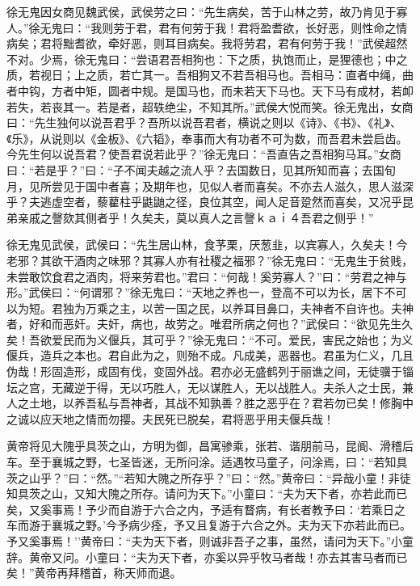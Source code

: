 \documentclass[]{article}
\begin{document}
徐无鬼因女商见魏武侯，武侯劳之曰：``先生病矣，苦于山林之劳，故乃肯见于寡人。''徐无鬼曰：``我则劳于君，君有何劳于我！君将盈耆欲，长好恶，则性命之情病矣；君将黜耆欲，牵好恶，则耳目病矣。我将劳君，君有何劳于我！''武侯超然不对。少焉，徐无鬼曰：``尝语君吾相狗也：下之质，执饱而止，是狸德也；中之质，若视日；上之质，若亡其一。吾相狗又不若吾相马也。吾相马：直者中绳，曲者中钩，方者中矩，圆者中规。是国马也，而未若天下马也。天下马有成材，若卹若失，若丧其一。若是者，超轶绝尘，不知其所。''武侯大悦而笑。徐无鬼出，女商曰：``先生独何以说吾君乎？吾所以说吾君者，横说之则以《诗》、《书》、《礼》、《乐》，从说则以《金板》、《六韬》，奉事而大有功者不可为数，而吾君未尝启齿。今先生何以说吾君？使吾君说若此乎？''徐无鬼曰：``吾直告之吾相狗马耳。''女商曰：``若是乎？''曰：``子不闻夫越之流人乎？去国数日，见其所知而喜；去国旬月，见所尝见于国中者喜；及期年也，见似人者而喜矣。不亦去人滋久，思人滋深乎？夫逃虚空者，藜藋柱乎鼪鼬之径，良位其空，闻人足音跫然而喜矣，又况乎昆弟亲戚之謦欬其侧者乎！久矣夫，莫以真人之言謦ｋａｉ４吾君之侧乎！''

徐无鬼见武侯，武侯曰：``先生居山林，食芧栗，厌葱韭，以宾寡人，久矣夫！今老邪？其欲干酒肉之味邪？其寡人亦有社稷之福邪？''徐无鬼曰：``无鬼生于贫贱，未尝敢饮食君之酒肉，将来劳君也。''君曰：``何哉！奚劳寡人？''曰：``劳君之神与形。''武侯曰：``何谓邪？''徐无鬼曰：``天地之养也一，登高不可以为长，居下不可以为短。君独为万乘之主，以苦一国之民，以养耳目鼻口，夫神者不自许也。夫神者，好和而恶奸。夫奸，病也，故劳之。唯君所病之何也？''武侯曰：``欲见先生久矣！吾欲爱民而为义偃兵，其可乎？''徐无鬼曰：``不可。爱民，害民之始也；为义偃兵，造兵之本也。君自此为之，则殆不成。凡成美，恶器也。君虽为仁义，几且伪哉！形固造形，成固有伐，变固外战。君亦必无盛鹤列于丽谯之间，无徒骥于锱坛之宫，无藏逆于得，无以巧胜人，无以谋胜人，无以战胜人。夫杀人之士民，兼人之土地，以养吾私与吾神者，其战不知孰善？胜之恶乎在？君若勿已矣！修胸中之诚以应天地之情而勿撄。夫民死已脱矣，君将恶乎用夫偃兵哉！

黄帝将见大隗乎具茨之山，方明为御，昌寓骖乘，张若、谐朋前马，昆阍、滑稽后车。至于襄城之野，七圣皆迷，无所问涂。适遇牧马童子，问涂焉，曰：``若知具茨之山乎？''曰：``然。''``若知大隗之所存乎？''曰：``然。''黄帝曰：``异哉小童！非徒知具茨之山，又知大隗之所存。请问为天下。''小童曰：``夫为天下者，亦若此而已矣，又奚事焉！予少而自游于六合之内，予适有瞀病，有长者教予曰：`若乘日之车而游于襄城之野。'今予病少痊，予又且复游于六合之外。夫为天下亦若此而已。予又奚事焉！''黄帝曰：``夫为天下者，则诚非吾子之事，虽然，请问为天下。''小童辞。黄帝又问。小童曰：``夫为天下者，亦奚以异乎牧马者哉！亦去其害马者而已矣！''黄帝再拜稽首，称天师而退。
\end{document}
